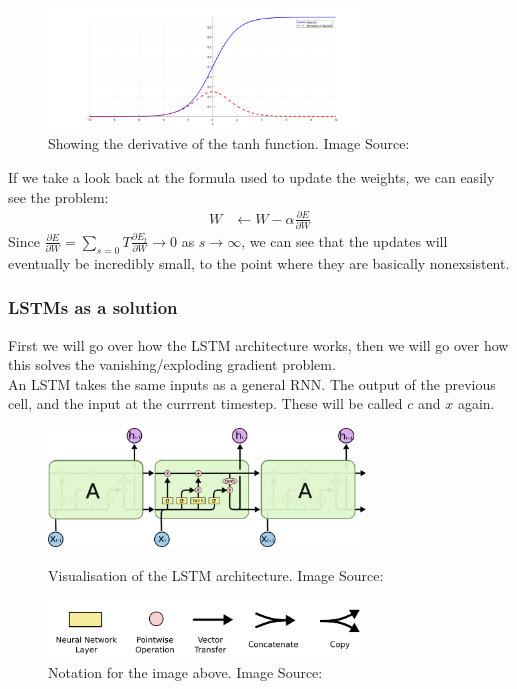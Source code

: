 \begin{figure}[ht]
    \centering
        \includegraphics[width=0.75\textwidth]{latex/imgs/tanh_deriv.png}
    \caption{Showing the derivative of the tanh function. Image Source:\cite{grad}}
\end{figure}
If we take a look back at the formula used to update the weights, we can easily see the problem:
\begin{align}
    W &\leftarrow W - \alpha \frac{\partial E}{\partial W}
\end{align}
Since $\frac{\partial E}{\partial W} = \sum_{s=0}{T} \frac{\partial E_t}{\partial W} \rightarrow 0$ as $s \rightarrow \infty$, we can see that the updates will eventually be incredibly small, to the point where they are basically nonexsistent.

\subsubsection{LSTMs as a solution}
First we will go over how the LSTM architecture works, then we will go over how this solves the vanishing/exploding gradient problem.\\

\noindent
An LSTM takes the same inputs as a general RNN. The output of the previous cell, and the input at the currrent timestep. These will be called $c$ and $x$ again.\\
\begin{figure}[ht]
    \centering
        \includegraphics[width=0.75\textwidth]{latex/imgs/lstm.png}
    \caption{Visualisation of the LSTM architecture. Image Source:\cite{lstm}}
    \centering
        \includegraphics[width=0.75\textwidth]{latex/imgs/lstm_notation.png}
    \caption{Notation for the image above. Image Source:\cite{lstm}}
\end{figure}